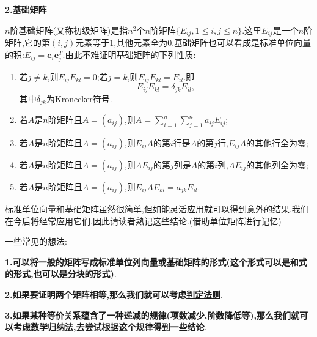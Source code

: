\documentclass[../../main.tex]{subfiles}%
\begin{document}
\begin{proposition}[标准单位向量和基础矩阵]
\large{\textbf{2.基础矩阵}}

\(n\)阶基础矩阵(又称初级矩阵)是指\(n^{2}\)个\(n\)阶矩阵\(\{E_{ij}, 1\leqslant  i,j\leqslant  n\}\).这里\(E_{ij}\)是一个\(n\)阶矩阵,它的第\((i,j)\)元素等于\(1\),其他元素全为\(0\).基础矩阵也可以看成是标准单位向量的积:\(E_{ij}=\boldsymbol{e}_{i}\boldsymbol{e}_{j}^{T}\).由此不难证明基础矩阵的下列性质:
\begin{enumerate}
\item 若\(j\neq k\),则\(E_{ij}E_{kl} = 0\);若\(j = k\),则\(E_{ij}E_{kl}=E_{il}\).即$$E_{ij}E_{kl}=\delta_{jk}E_{il},$$其中$\delta_{jk}$为Kronecker符号.

\item  若\(A\)是\(n\)阶矩阵且\(A=(a_{ij})\),则\(A=\sum_{i = 1}^{n}\sum_{j = 1}^{n}a_{ij}E_{ij}\);

\item  若\(A\)是\(n\)阶矩阵且\(A=(a_{ij})\),则\(E_{ij}A\)的第\(i\)行是\(A\)的第\(j\)行,\(E_{ij}A\)的其他行全为零;

\item  若\(A\)是\(n\)阶矩阵且\(A=(a_{ij})\),则\(AE_{ij}\)的第\(j\)列是\(A\)的第\(i\)列,\(AE_{ij}\)的其他列全为零;

\item  若\(A\)是\(n\)阶矩阵且\(A=(a_{ij})\),则\(E_{ij}AE_{kl}=a_{jk}E_{il}\).
\end{enumerate}
\end{proposition}
\begin{note}
标准单位向量和基础矩阵虽然很简单,但如能灵活应用就可以得到意外的结果.我们在今后将经常应用它们,因此请读者熟记这些结论.(借助单位矩阵进行记忆)

一些常见的想法:

\textbf{1.可以将一般的矩阵写成标准单位列向量或基础矩阵的形式(这个形式可以是和式的形式,也可以是分块的形式)}.

\textbf{2.如果要证明两个矩阵相等,那么我们就可以考虑\hyperlink{proposition:矩阵相等的判定法则}{判定法则}}.

\textbf{3.如果某种等价关系蕴含了一种递减的规律(项数减少,阶数降低等),那么我们就可以考虑数学归纳法,去尝试根据这个规律得到一些结论}.
\end{note}
\end{document}

